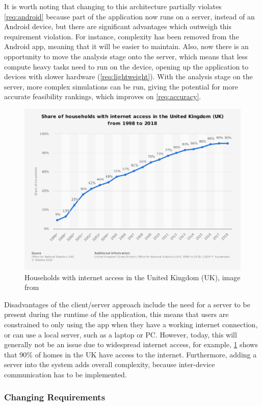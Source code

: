 It is worth noting that changing to this architecture partially violates \cref{req:android} because part of the application now runs on a server, instead of an Android device, but there are significant advantages which outweigh this requirement violation. For instance, complexity has been removed from the Android app, meaning that it will be easier to maintain. Also, now there is an opportunity to move the analysis stage onto the server, which means that less compute heavy tasks need to run on the device, opening up the application to devices with slower hardware (\cref{req:lightweight}). With the analysis stage on the server, more complex simulations can be run, giving the potential for more accurate feasibility rankings, which improves on \cref{req:accuracy}.

\begin{figure}[ht]
    \centering
    \includegraphics[width=.6\linewidth]{images/design/homeswithinternet}
    \caption{Households with internet access in the United Kingdom (UK), image from \cite{internetaccess}}
    \label{fig:internet}
\end{figure}

Disadvantages of the client/server approach include the need for a server to be present during the runtime of the application, this means that users are constrained to only using the app when they have a working internet connection, or can use a local server, such as a laptop or PC. However, today, this will generally not be an issue due to widespread internet access, for example, \cref{fig:internet} shows that 90\% of homes in the UK have access to the internet. Furthermore, adding a server into the system adds overall complexity, because inter-device communication has to be implemented.

\subsubsection{Changing Requirements}\label{subsec:changingrequirements}

